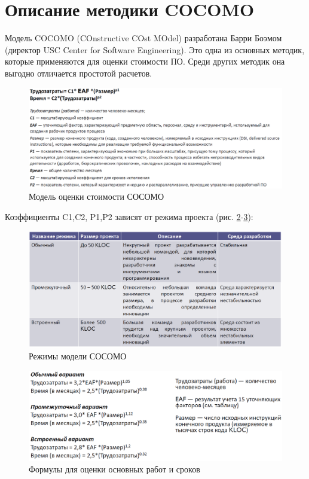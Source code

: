 \section*{Описание методики COCOMO}
Модель COCOMO (COnstructive COst MOdel) разработана Барри Боэмом
(директор USC Center for Software Engineering). Это одна из основных методик,
которые применяются для оценки стоимости ПО. Среди других методик она
выгодно отличается простотой расчетов.

\begin{figure}[!h]
	\centering
	\includegraphics[width=1\linewidth]{inc/img/0.png}
	\caption{Модель оценки стоимости СОСОМО}
	\label{p0}
\end{figure}

Коэффициенты C1,C2, P1,P2 зависят от режима проекта (рис. \ref{p1}-\ref{p2}):
\begin{figure}[!h]
	\centering
	\includegraphics[width=1\linewidth]{inc/img/1.png}
	\caption{Режимы модели СОСОМО}
	\label{p1}
\end{figure}

\begin{figure}[!h]
	\centering
	\includegraphics[width=1\linewidth]{inc/img/2.png}
	\caption{Формулы для оценки основных работ и сроков}
	\label{p2}
\end{figure}

